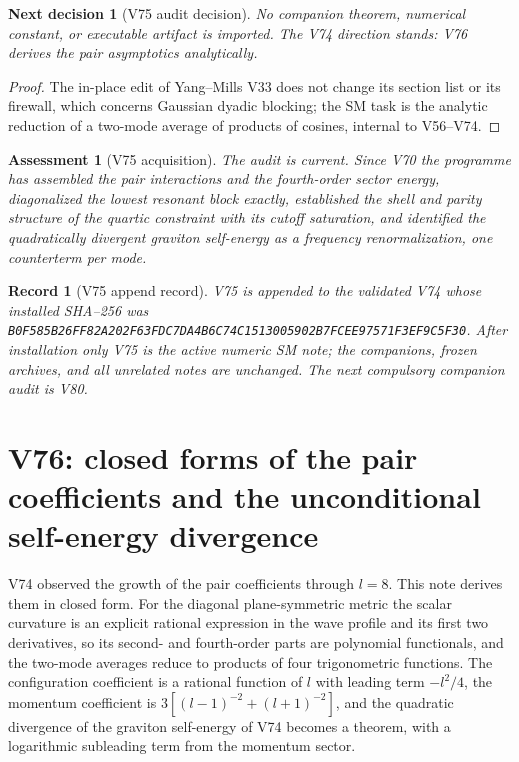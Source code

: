 \documentclass[11pt]{article}
\newtheorem{decision}[theorem]{Next decision}
\newtheorem{assessment}[theorem]{Assessment}
\newtheorem{record}[theorem]{Record}
\theoremstyle{remark}
\begin{document}
\begin{decision}[V75 audit decision]
\label{dec:v19v75-audit}
No companion theorem, numerical constant, or executable artifact is
imported.  The V74 direction stands: V76 derives the pair asymptotics
analytically.
\end{decision}

\begin{proof}
The in-place edit of Yang--Mills V33 does not change its section list
or its firewall, which concerns Gaussian dyadic blocking; the SM task is
the analytic reduction of a two-mode average of products of cosines,
internal to V56--V74.
\end{proof}

\begin{assessment}[V75 acquisition]
\label{ass:v19v75}
The audit is current.  Since V70 the programme has assembled the pair
interactions and the fourth-order sector energy, diagonalized the
lowest resonant block exactly, established the shell and parity
structure of the quartic constraint with its cutoff saturation, and
identified the quadratically divergent graviton self-energy as a
frequency renormalization, one counterterm per mode.
\end{assessment}

\begin{record}[V75 append record]
\label{rec:v19v75}
V75 is appended to the validated V74 whose installed SHA--256 was
\texttt{B0F585B26FF82A202F63FDC7DA4B6C74C1513005902B7FCEE97571F3EF9C5F30}.
After installation only V75 is the active numeric SM note; the
companions, frozen archives, and all unrelated notes are unchanged.  The
next compulsory companion audit is V80.
\end{record}


\section{V76: closed forms of the pair coefficients and the unconditional self-energy divergence}
\label{sec:v19v76}

V74 observed the growth of the pair coefficients through \(l=8\).  This
note derives them in closed form.  For the diagonal plane-symmetric
metric the scalar curvature is an explicit rational expression in the
wave profile and its first two derivatives, so its second- and
fourth-order parts are polynomial functionals, and the two-mode
averages reduce to products of four trigonometric functions.  The
configuration coefficient is a rational function of \(l\) with leading
term \(-l^2/4\), the momentum coefficient is
\(3[(l-1)^{-2}+(l+1)^{-2}]\), and the quadratic divergence of the
graviton self-energy of V74 becomes a theorem, with a logarithmic
subleading term from the momentum sector.
\end{document}
